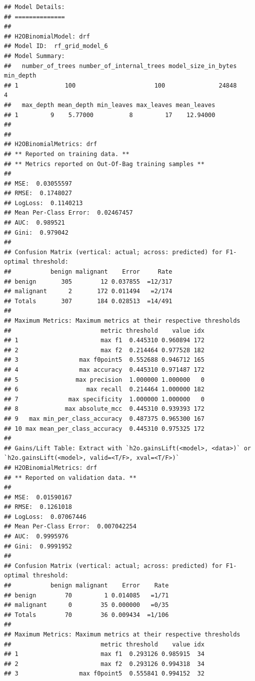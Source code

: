 \documentclass[]{article}
\begin{document}
\begin{verbatim}
## Model Details:
## ==============
## 
## H2OBinomialModel: drf
## Model ID:  rf_grid_model_6 
## Model Summary: 
##   number_of_trees number_of_internal_trees model_size_in_bytes min_depth
## 1             100                      100               24848         4
##   max_depth mean_depth min_leaves max_leaves mean_leaves
## 1         9    5.77000          8         17    12.94000
## 
## 
## H2OBinomialMetrics: drf
## ** Reported on training data. **
## ** Metrics reported on Out-Of-Bag training samples **
## 
## MSE:  0.03055597
## RMSE:  0.1748027
## LogLoss:  0.1140213
## Mean Per-Class Error:  0.02467457
## AUC:  0.989521
## Gini:  0.979042
## 
## Confusion Matrix (vertical: actual; across: predicted) for F1-optimal threshold:
##           benign malignant    Error     Rate
## benign       305        12 0.037855  =12/317
## malignant      2       172 0.011494   =2/174
## Totals       307       184 0.028513  =14/491
## 
## Maximum Metrics: Maximum metrics at their respective thresholds
##                         metric threshold    value idx
## 1                       max f1  0.445310 0.960894 172
## 2                       max f2  0.214464 0.977528 182
## 3                 max f0point5  0.552688 0.946712 165
## 4                 max accuracy  0.445310 0.971487 172
## 5                max precision  1.000000 1.000000   0
## 6                   max recall  0.214464 1.000000 182
## 7              max specificity  1.000000 1.000000   0
## 8             max absolute_mcc  0.445310 0.939393 172
## 9   max min_per_class_accuracy  0.487375 0.965300 167
## 10 max mean_per_class_accuracy  0.445310 0.975325 172
## 
## Gains/Lift Table: Extract with `h2o.gainsLift(<model>, <data>)` or `h2o.gainsLift(<model>, valid=<T/F>, xval=<T/F>)`
## H2OBinomialMetrics: drf
## ** Reported on validation data. **
## 
## MSE:  0.01590167
## RMSE:  0.1261018
## LogLoss:  0.07067446
## Mean Per-Class Error:  0.007042254
## AUC:  0.9995976
## Gini:  0.9991952
## 
## Confusion Matrix (vertical: actual; across: predicted) for F1-optimal threshold:
##           benign malignant    Error    Rate
## benign        70         1 0.014085   =1/71
## malignant      0        35 0.000000   =0/35
## Totals        70        36 0.009434  =1/106
## 
## Maximum Metrics: Maximum metrics at their respective thresholds
##                         metric threshold    value idx
## 1                       max f1  0.293126 0.985915  34
## 2                       max f2  0.293126 0.994318  34
## 3                 max f0point5  0.555841 0.994152  32

\end{verbatim}
\end{document}
